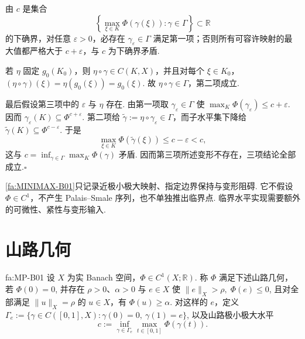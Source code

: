 \begin{FAProof}
由 \(\displaystyle c\) 是集合
\[
\left\{
\max_{\xi\in K}\Phi(\gamma(\xi)):\gamma\in\Gamma
\right\}
\subset\mathbb R
\]
的下确界，对任意 \(\displaystyle\varepsilon>0\)，必存在 \(\displaystyle\gamma_\varepsilon\in\Gamma\) 满足第一项；否则所有可容许映射的最大值都严格大于 \(\displaystyle c+\varepsilon\)，与 \(\displaystyle c\) 为下确界矛盾.

若 \(\displaystyle\eta\) 固定 \(\displaystyle g_0(K_0)\)，则 \(\displaystyle\eta\circ\gamma\in C(K,X)\)，并且对每个 \(\displaystyle\xi\in K_0\)，
\(\displaystyle (\eta\circ\gamma)(\xi) = \eta(g_0(\xi)) = g_0(\xi)\).
故 \(\displaystyle\eta\circ\gamma\in\Gamma\)，第二项成立.

最后假设第三项中的 \(\displaystyle\varepsilon\) 与 \(\displaystyle\eta\) 存在. 由第一项取 \(\displaystyle\gamma_\varepsilon\in\Gamma\) 使 \(\displaystyle\max_K\Phi(\gamma_\varepsilon)\leqslant c+\varepsilon\). 因而 \(\displaystyle\gamma_\varepsilon(K)\subseteq\Phi^{c+\varepsilon}\). 第二项给 \(\displaystyle\widetilde\gamma:=\eta\circ\gamma_\varepsilon\in\Gamma\)，而子水平集下降给
\(\displaystyle \widetilde\gamma(K) \subseteq \Phi^{c-\varepsilon}\).
于是
\[
\max_{\xi\in K}\Phi(\widetilde\gamma(\xi))
\leqslant
c-\varepsilon
<
c,
\]
这与 \(\displaystyle c=\inf_{\gamma\in\Gamma}\max_K\Phi(\gamma)\) 矛盾. 因而第三项所述变形不存在，三项结论全部成立.\hfill\(\square\)
\end{FAProof}

\begin{FARemark}[极小极大框架的逻辑边界]
\autoref{fa:MINIMAX-B01}只记录近极小极大映射、指定边界保持与变形阻碍. 它不假设 \(\displaystyle\Phi\in C^1\)，不产生 Palais--Smale 序列，也不单独推出临界点. 临界水平实现需要额外的可微性、紧性与变形输入.
\end{FARemark}

\section{山路几何}\label{sec:iii10-mountain-pass-geometry}

\begin{FADefinition}[B][山路几何]{fa:MP-B01}
设 \(\displaystyle X\) 为实 Banach 空间，\(\displaystyle\Phi\in C^1(X;\mathbb R)\). 称 \(\displaystyle\Phi\) 满足下述山路几何，若
\(\displaystyle \Phi(0)=0\),
并存在 \(\displaystyle\rho>0\)、\(\displaystyle\alpha>0\) 与 \(\displaystyle e\in X\) 使
\(\displaystyle \|e\|_X>\rho, \; \Phi(e)\leqslant0\),
且对全部满足 \(\displaystyle\|u\|_X=\rho\) 的 \(\displaystyle u\in X\)，有 \(\displaystyle\Phi(u)\geqslant\alpha\). 对这样的 \(\displaystyle e\)，定义
\(\displaystyle \Gamma_e := \{\gamma\in C([0,1],X):\gamma(0)=0,\ \gamma(1)=e\}\),
以及山路极小极大水平
\[
c
:=
\inf_{\gamma\in\Gamma_e}
\max_{t\in[0,1]}\Phi(\gamma(t)).
\]
\end{FADefinition}

